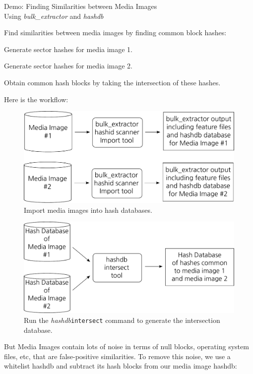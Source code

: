 \documentclass[12pt,twoside]{article}
\newcommand{\hdb}{\emph{hashdb}\xspace}
\newcommand{\bulk}{\emph{bulk\_extractor}\xspace}
\begin{document}
\begin{center}
\Large Demo: Finding Similarities between Media Images \\
\large Using \bulk and \hdb
\end{center}

Find similarities between media images by finding common block hashes:
\begin{compactenum}
\item Generate sector hashes for media image 1.
\item Generate sector hashes for media image 2.
\item Obtain common hash blocks by taking the intersection of these hashes.
\end{compactenum}
Here is the workflow:
\begin{figure}[H]
  \center
  \includegraphics[scale=0.6]{drawings/import_hashes}
  \caption*{Import media images into hash databases.}
\end{figure}

\begin{figure}[H]
  \center
  \includegraphics[scale=0.6]{drawings/intersect_hashes}
  \caption*{Run the \hdb \texttt{intersect} command to generate the intersection database.}
\end{figure}

But Media Images contain lots of noise in terms of null blocks,
operating system files, etc, that are false-positive similarities.
To remove this noise, we use a whitelist hashdb and subtract its hash blocks
from our media image hashdb:
\end{document}
